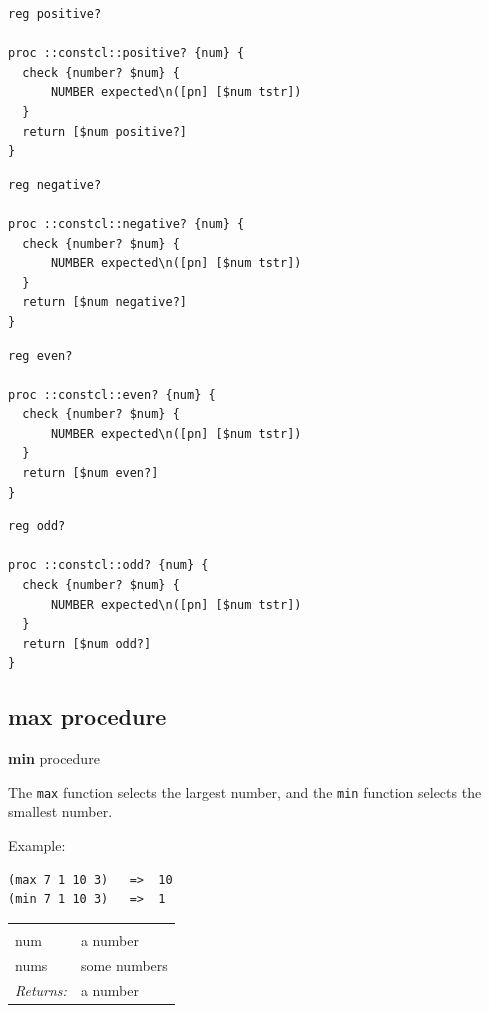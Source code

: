 \documentclass[twoside]{report}
\begin{document}
\begin{lstlisting}
reg positive?

proc ::constcl::positive? {num} {
  check {number? $num} {
      NUMBER expected\n([pn] [$num tstr])
  }
  return [$num positive?]
}
\end{lstlisting}

\begin{lstlisting}
reg negative?

proc ::constcl::negative? {num} {
  check {number? $num} {
      NUMBER expected\n([pn] [$num tstr])
  }
  return [$num negative?]
}
\end{lstlisting}

\begin{lstlisting}
reg even?

proc ::constcl::even? {num} {
  check {number? $num} {
      NUMBER expected\n([pn] [$num tstr])
  }
  return [$num even?]
}
\end{lstlisting}

\begin{lstlisting}
reg odd?

proc ::constcl::odd? {num} {
  check {number? $num} {
      NUMBER expected\n([pn] [$num tstr])
  }
  return [$num odd?]
}
\end{lstlisting}

\subsection{max procedure}
\label{max-procedure}

\textbf{min} procedure

The \texttt{max} function selects the largest number, and the \texttt{min} function selects the smallest number.

Example:

\begin{verbatim}
(max 7 1 10 3)   =>  10
(min 7 1 10 3)   =>  1
\end{verbatim}

\noindent\begin{tabular}{ |p{1.9cm} p{8cm}| }
\hline
\rowcolor[HTML]{CCCCCC} \multicolumn{2}{|l|}{\bf max, min (public)} \\
num & a number \\
nums & some numbers \\
\textit{Returns:} & a number \\
\hline
\end{tabular}
\end{document}
